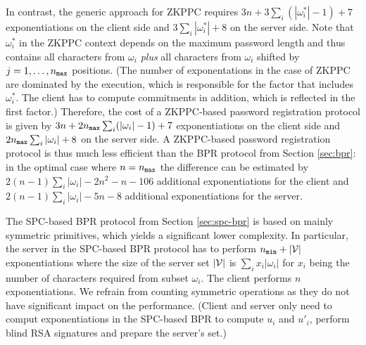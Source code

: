 In contrast, the generic approach for \ac{ZKPPC} requires $3n+3\sum_i (|\omega^\ast_i|-1)+7$ exponentiations on the client side and $3\sum_i |\omega^\ast_i|+8$ on the server side.
Note that $\omega^\ast_i$ in the \ac{ZKPPC} context depends on the maximum password length and thus contains all characters from $\omega_i$ \emph{plus} all characters from $\omega_i$ shifted by $j = 1,\ldots, {n_\mathtt{max}}$ positions.
(The number of exponentations in the case of \ac{ZKPPC} are dominated by the \PoM execution, which is responsible for the factor that includes $\omega^\ast_i$.
The client has to compute commitments in addition, which is reflected in the first factor.)
Therefore, the cost of a \ac{ZKPPC}-based password registration protocol is given by $3n+2{n_\mathtt{max}}\sum_i (|\omega_i|-1)+7$ exponentiations on the client side and $2{n_\mathtt{max}}\sum_i |\omega_i|+8$ on the server side. 
A \ac{ZKPPC}-based password registration protocol is thus much less efficient than the \ac{BPR} protocol from Section \ref{sec:bpr}: in the optimal case where $n={n_\mathtt{max}}$ the difference can be estimated by  $2(n-1)\sum_i|\omega_i| - 2n^2 - n - 106$ additional exponentiations for the client and $2(n-1)\sum_i|\omega_i| - 5n - 8$ additional exponentiations for the server.

The \ac{SPC}-based \ac{BPR} protocol from Section \ref{sec:spc-bpr} is based on mainly symmetric primitives, which yields a significant lower complexity.
In particular, the server in the \ac{SPC}-based \ac{BPR} protocol has to perform ${n_\mathtt{min}}+|\mathcal{V}|$ exponentiations where the size of the server set $|\mathcal{V}|$ is $\sum_i x_i|\omega_i|$ for $x_i$ being the number of characters required from subset $\omega_i$.
The client performs $n$ exponentiations.
We refrain from counting symmetric operations as they do not have significant impact on the performance.
(Client and server only need to comput exponentiations in the \ac{SPC}-based \ac{BPR} to compute $u_i$ and $u'_i$, \ie perform blind RSA signatures and prepare the server's set.)

